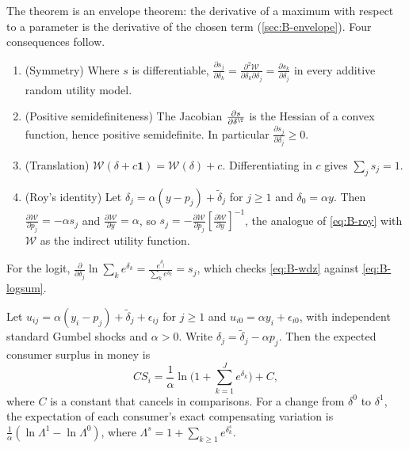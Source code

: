 The theorem is an envelope theorem: the derivative of a maximum with respect to a parameter is the
derivative of the chosen term (\cref{sec:B-envelope}). Four consequences follow.
\begin{enumerate}[label=(\alph*)]
\item (Symmetry) Where $s$ is differentiable, $\frac{\partial s_j}{\partial\delta_k} = \frac{\partial^2\mathcal{W}}{\partial\delta_k\partial\delta_j}
  = \frac{\partial s_k}{\partial\delta_j}$ in every additive random utility model.
\item (Positive semidefiniteness) The Jacobian $\frac{\partial s}{\partial\delta^\T}$ is the Hessian of a convex function,
  hence positive semidefinite. In particular $\frac{\partial s_j}{\partial\delta_j} \geq 0$.
\item (Translation) $\mathcal{W}(\delta + c\mathbf{1}) = \mathcal{W}(\delta) + c$. Differentiating in $c$ gives $\sum_js_j = 1$.
\item (Roy's identity) Let $\delta_j = \alpha(y - p_j) + \tilde\delta_j$ for $j \geq 1$ and $\delta_0 = \alpha y$. Then
  $\frac{\partial\mathcal{W}}{\partial p_j} = -\alpha s_j$ and $\frac{\partial\mathcal{W}}{\partial y} = \alpha$, so
  $s_j = -\frac{\partial\mathcal{W}}{\partial p_j}\left[\frac{\partial\mathcal{W}}{\partial y}\right]^{-1}$, the analogue of
  \eqref{eq:B-roy} with $\mathcal{W}$ as the indirect utility function.
\end{enumerate}
For the logit, $\frac{\partial}{\partial\delta_j}\ln\sum_ke^{\delta_k} = \frac{e^{\delta_j}}{\sum_ke^{\delta_k}} = s_j$, which checks
\eqref{eq:B-wdz} against \eqref{eq:B-logsum}.

\begin{proposition}\label{prop:B-cs}
Let $u_{ij} = \alpha(y_i - p_j) + \tilde\delta_j + \epsilon_{ij}$ for $j \geq 1$ and $u_{i0} = \alpha y_i + \epsilon_{i0}$, with
independent standard Gumbel shocks and $\alpha > 0$. Write $\delta_j = \tilde\delta_j - \alpha p_j$. Then the expected
consumer surplus in money is
\begin{equation}\label{eq:B-cs}
CS_i = \frac{1}{\alpha}\ln\Big(1 + \sum_{k = 1}^Je^{\delta_k}\Big) + C,
\end{equation}
where $C$ is a constant that cancels in comparisons. For a change from $\delta^0$ to $\delta^1$, the
expectation of each consumer's exact compensating variation is
$\frac{1}{\alpha}\left(\ln\Lambda^1 - \ln\Lambda^0\right)$, where $\Lambda^s = 1 + \sum_{k \geq 1}e^{\delta_k^s}$.
\end{proposition}

